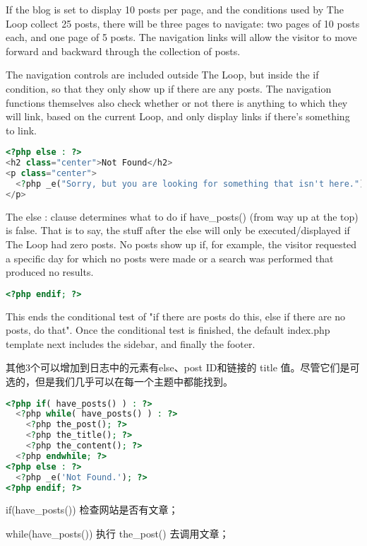 If the blog is set to display 10 posts per page, and the conditions used by The Loop collect 25 posts, there will be three pages to navigate: two pages of 10 posts each, and one page of 5 posts. The navigation links will allow the visitor to move forward and backward through the collection of posts.

The navigation controls are included outside The Loop, but inside the if condition, so that they only show up if there are any posts. The navigation functions themselves also check whether or not there is anything to which they will link, based on the current Loop, and only display links if there's something to link.

\begin{lstlisting}[language=PHP]
<?php else : ?>
<h2 class="center">Not Found</h2>
<p class="center">
  <?php _e("Sorry, but you are looking for something that isn't here."); ?>
</p>
\end{lstlisting}

The else : clause determines what to do if have\_posts() (from way up at the top) is false. That is to say, the stuff after the else will only be executed/displayed if The Loop had zero posts. No posts show up if, for example, the visitor requested a specific day for which no posts were made or a search was performed that produced no results.

\begin{lstlisting}[language=PHP]
<?php endif; ?>
\end{lstlisting}

This ends the conditional test of "if there are posts do this, else if there are no posts, do that". Once the conditional test is finished, the default index.php template next includes the sidebar, and finally the footer.

其他3个可以增加到日志中的元素有else、post ID和链接的 title 值。尽管它们是可选的，但是我们几乎可以在每一个主题中都能找到。

\begin{lstlisting}[language=PHP]
<?php if( have_posts() ) : ?>
  <?php while( have_posts() ) : ?>
    <?php the_post(); ?>
    <?php the_title(); ?>
    <?php the_content(); ?>
  <?php endwhile; ?>
<?php else : ?>
  <?php _e('Not Found.'); ?>
<?php endif; ?>    
\end{lstlisting}

\begin{compactenum}
\item if(have\_posts()) 检查网站是否有文章；
\item while(have\_posts()) 执行 the\_post() 去调用文章；
\end{compactenum}

